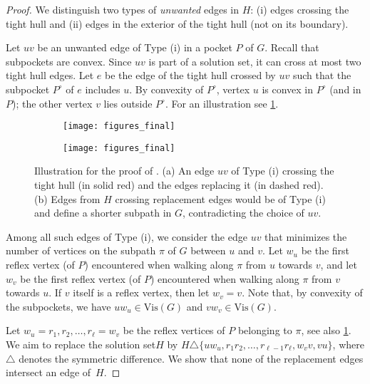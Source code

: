 \documentclass[a4paper,runningheads,cleveref,thm-restate]{lipics-v2021}
\newcommand{\Vis}[1]{\ensuremath{\mathrm{Vis}(#1)}}
\newcommand{\hset}{solution set\xspace}
\begin{document}
\begin{proof}	
	We distinguish two types of \emph{unwanted} edges in $H$: 
	(i) edges crossing the tight hull
	and (ii) edges in the exterior of the tight hull (not on its boundary).

Let $uv$ be an unwanted edge of Type (i) in a pocket $P$ of $G$.  
	Recall that subpockets are convex. 
	Since $uv$ is part of a \hset, it can cross at most two tight hull edges.
	Let $e$ be the edge of the tight hull crossed by $uv$ such that the subpocket $P^\circ$ of $e$ includes $u$. 
By convexity of $P^\circ$, 
vertex $u$ is convex in $P^\circ$ (and in $P$); the other vertex $v$ lies outside $P^\circ$. For an illustration see \cref{fig:tightHullA}.

  
	
	\begin{figure}[htb]
		\centering
		\begin{subfigure}{.45\textwidth}
			\centering
			\texttt{[image: figures\_final]}
			\caption{}
			\label{fig:tightHullA}
		\end{subfigure}\hfill
		\begin{subfigure}{.45\textwidth}
			\centering
			\texttt{[image: figures\_final]}
			\caption{}
			\label{fig:tightHullB}
		\end{subfigure}
		\caption{
			Illustration for the proof of .
			(a) An edge $uv$ of Type (i) crossing the tight hull (in solid red) and the edges replacing it (in dashed red). \linebreak(b) {Edges from $H$ crossing replacement edges would be of Type (i) and define a shorter subpath in $G$, contradicting the choice of $uv$.} }
		\label{fig:tightHull}
	\end{figure} 
	
	
	Among all such edges of {Type (i)}, we consider the edge $uv$ that minimizes the number of vertices on the subpath $\pi$ of $G$ between $u$ and $v$.
	Let $w_u$  be the first reflex vertex (of $P$) encountered when walking along $\pi$ from $u$ towards $v$, and let $w_v$ be the first reflex vertex (of $P$) encountered when walking along $\pi$ from $v$ towards $u$. 
	If $v$ itself is a reflex vertex, then let $w_v = v$.
	Note that, by convex{ity} of the subpockets, we have $uw_u\in\Vis{G}$ and $vw_v\in\Vis{G}$. 
	
	Let $w_u = r_1, r_2, \dots, r_{\ell} = w_v$ be the 
	reflex vertices of $P$ belonging to $\pi$, see also \cref{fig:tightHullA}.
	We aim to replace the \hset $H$ by $H \triangle \{uw_u, r_{1}r_{2}, \dots, r_{\ell-1}r_\ell,w_vv,vu\}$, where $\triangle$ denotes the symmetric difference. We show that none of the replacement edges intersect an edge of~$H$.
	

\end{proof}
\end{document}
